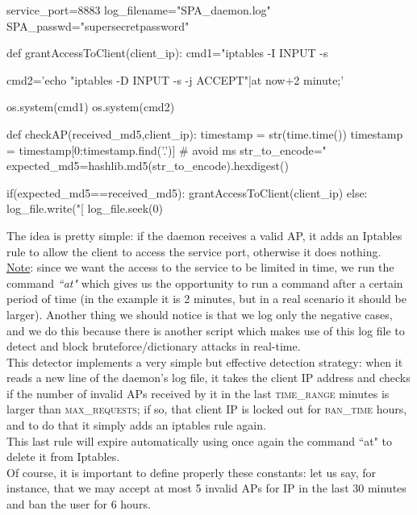 \documentclass[12pt]{report}
\begin{document}
{\begin{python}
service_port=8883
log_filename="SPA_daemon.log"
SPA_passwd="supersecretpassword"

def grantAccessToClient(client_ip):
  cmd1="iptables -I INPUT -s %
  
  cmd2='echo "iptables -D INPUT -s %
        -j ACCEPT"|at now+2 minute;' %
        
  os.system(cmd1)
  os.system(cmd2)                                      
                                         
                                                            
def checkAP(received_md5,client_ip):
  timestamp = str(time.time())
  timestamp = timestamp[0:timestamp.find('.')] # avoid ms
  str_to_encode="%
  expected_md5=hashlib.md5(str_to_encode).hexdigest()

  if(expected_md5==received_md5):
    grantAccessToClient(client_ip)
  else:
    log_file.write("[%
    log_file.seek(0)
  
\end{python}
\bigskip

The idea is pretty simple: if the daemon receives a valid AP, it adds an Iptables rule to allow the client to access the service port, otherwise it does nothing.\\
\underline{Note}: since we want the access to the service to be limited in time, we run the command \emph{``at"} which gives us the opportunity to run a command after a certain period of time (in the example it is 2 minutes, but in a real scenario it should be larger). Another thing we should notice is that we log only the negative cases, and we do this because there is another script which makes use of this log file to detect and block bruteforce/dictionary attacks in real-time.\\

This detector implements a very simple but effective detection strategy: when it reads a new line of the daemon's log file, it takes the client IP address and checks if the number of invalid APs received by it in the last \textsc{time\_range} minutes is larger than \textsc{max\_requests}; if so, that client IP is locked out for \textsc{ban\_time} hours, and to do that it simply adds an iptables rule again.\\
This last rule will expire automatically using once again the command ``at" to delete it from Iptables.\\
Of course, it is important to define properly these constants: let us say, for instance, that we may accept at most 5 invalid APs for IP in the last 30 minutes and ban the user for 6 hours.\\

}
\end{document}
